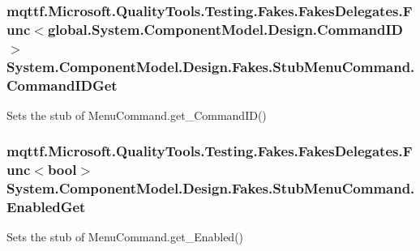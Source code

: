 \hypertarget{class_system_1_1_component_model_1_1_design_1_1_fakes_1_1_stub_menu_command_aa0f4fc8d7a2bc3505ef4db12f72fdf98}{
\subsubsection[{Command\-I\-D\-Get}]{\setlength{\rightskip}{0pt plus 5cm}mqttf.\-Microsoft.\-Quality\-Tools.\-Testing.\-Fakes.\-Fakes\-Delegates.\-Func$<$global.\-System.\-Component\-Model.\-Design.\-Command\-I\-D$>$ System.\-Component\-Model.\-Design.\-Fakes.\-Stub\-Menu\-Command.\-Command\-I\-D\-Get}}\label{class_system_1_1_component_model_1_1_design_1_1_fakes_1_1_stub_menu_command_aa0f4fc8d7a2bc3505ef4db12f72fdf98}


Sets the stub of Menu\-Command.\-get\-\_\-\-Command\-I\-D()

\hypertarget{class_system_1_1_component_model_1_1_design_1_1_fakes_1_1_stub_menu_command_a7c421af52cb54a8a06ac6c1bdcff7dab}{
\subsubsection[{Enabled\-Get}]{\setlength{\rightskip}{0pt plus 5cm}mqttf.\-Microsoft.\-Quality\-Tools.\-Testing.\-Fakes.\-Fakes\-Delegates.\-Func$<$bool$>$ System.\-Component\-Model.\-Design.\-Fakes.\-Stub\-Menu\-Command.\-Enabled\-Get}}\label{class_system_1_1_component_model_1_1_design_1_1_fakes_1_1_stub_menu_command_a7c421af52cb54a8a06ac6c1bdcff7dab}


Sets the stub of Menu\-Command.\-get\-\_\-\-Enabled()

